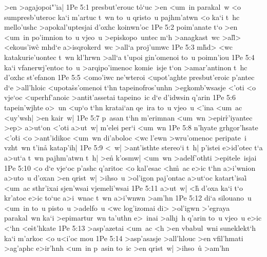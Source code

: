 >en
>agajopoi"'ia|\bibvsend
\vs 1Pe 5:1
presbut'erouc
t\r{o}`uc
>en
<um~in
parakal~w
<o
sumpresb'uteroc
ka`i
m'artuc
t~wn
to~u
qristo~u
pajhm'atwn
<o
ka`i
t~hc
mello'ushc
>apokal'uptesjai
d'oxhc
koinwn'oc\bibvsend
\vs 1Pe 5:2
poim'anate
t`o
>en
<um~in
po'imnion
to~u
vjeo~u
>episkopo~untec
m`h
>anagkast~wc
>al\r{l}>
<ekous'iw\r{c}
mhd`e
a>isqrokerd~wc
>all`a
proj'umwc\bibvsend
\vs 1Pe 5:3
m\r{h}d>
<wc
katakurie'uontec
t~wn
kl'hrwn
>all`a
t'upoi
gin'omenoi
to~u
poimn'iou\bibvsend
\vs 1Pe 5:4
ka`i
vfanerwj'entoc
to~u
>arqipo'imenoc
komie~isje
t`on
>amar'antinon
t~hc
d'oxhc
st'efanon\bibvsend
\vs 1Pe 5:5
<omo'iwc
ne'wteroi
<upot'aghte
presbut'eroic
p'antec
d`e
>all'hloic
<upota\r{s}s'omenoi
t`hn
tapeinofros'unhn
>egkomb'wsasje
<'oti
<o
vje`oc
<uperhf'anoic
>antit'assetai
tapeino~ic
d`e
d'idwsin
q'arin\bibvsend
\vs 1Pe 5:6
tapein'wjhte
o>~un
<up`o
t`hn
kratai`an
qe~ira
to~u
vjeo~u
<'ina
<um~ac
<uy'wsh|
>en
kair~w|\bibvsend
\vs 1Pe 5:7
p~asan
t`hn
m'erimnan
<um~wn
>epir\r{r}'iyantec
>ep>
a>ut`on
<'oti
a>ut~w|
m'elei
per`i
<um~wn\bibvsend
\vs 1Pe 5:8
n'hyate
grhgor'hsate
<'o\r{t}i
<o
>ant'idikoc
<um~wn
di'aboloc
<wc
l'ewn
>wru'omenoc
peripate~i
vzht~wn
t'ina\r{}
katap'ih|\bibvsend
\vs 1Pe 5:9
<~w|
>ant'isthte
stereo`i
t~h|
p'istei
e>id'otec
t`a
a>ut`a
t~wn
pajhm'atwn
t~h|
>e\r{n}
k'osmw|
<um~wn
>adelf'othti
>epitele~isjai\bibvsend
\vs 1Pe 5:10
<o
d`e
vje`oc
p'ashc
q'aritoc
<o
kal'esac
<h\r{m}~ac
e>ic
t`hn
a>i'wnion
a>uto~u
d'oxan
>en
qrist~w|
>ihso~u
>ol'igon
paj'ontac
a>ut`oc
katart'isai\r{}
<um~ac
sthr'ixai
sjen'wsai
vjemeli'wsai\bibvsend
\vs 1Pe 5:11
a>ut~w|
<h\r{}
d'oxa
ka`i
t`o
kr'atoc
e>ic
to`uc
a>i~wnac
t~wn
a>i'wnwn
>am'hn\bibvsend
\vs 1Pe 5:12
di`a
silouano~u
<um~in
to~u
pisto~u
>adelfo~u
<wc
log'izomai
di>
>ol'igwn
>'egraya
parakal~wn
ka`i
>epimartur~wn
ta'uthn
e>~inai
>alhj~h
q'arin
to~u
vjeo~u
e>ic
<`hn
<e\r{s}t'hkate\bibvsend
{}
\vs 1Pe 5:13
>asp'azetai
<um~ac
<h
>en
vbabul~wni
suneklekt`h
ka`i
m'arkoc
<o
u<i'oc
mou\bibvsend
\vs 1Pe 5:14
>asp'asasje
>all'hlouc
>en
vfil'hmati
>ag'aphc
e>ir'hnh
<um~in
p~asin
to~ic
>en
qrist~w|
>ihso~u\r{}
>am'hn\bibvsend
